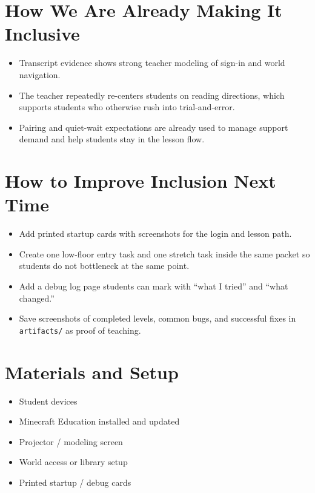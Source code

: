 \documentclass[11pt]{article}
\begin{document}
\section*{How We Are Already Making It Inclusive}
\begin{itemize}[leftmargin=*]
\item Transcript evidence shows strong teacher modeling of sign-in and world navigation.
\item The teacher repeatedly re-centers students on reading directions, which supports students who otherwise rush into trial-and-error.
\item Pairing and quiet-wait expectations are already used to manage support demand and help students stay in the lesson flow.
\end{itemize}

\section*{How to Improve Inclusion Next Time}
\begin{itemize}[leftmargin=*]
\item Add printed startup cards with screenshots for the login and lesson path.
\item Create one low-floor entry task and one stretch task inside the same packet so students do not bottleneck at the same point.
\item Add a debug log page students can mark with “what I tried” and “what changed.”
\item Save screenshots of completed levels, common bugs, and successful fixes in \texttt{artifacts/} as proof of teaching.
\end{itemize}

\section*{Materials and Setup}
\begin{itemize}[leftmargin=*]
\item Student devices
\item Minecraft Education installed and updated
\item Projector / modeling screen
\item World access or library setup
\item Printed startup / debug cards
\end{itemize}
\end{document}
